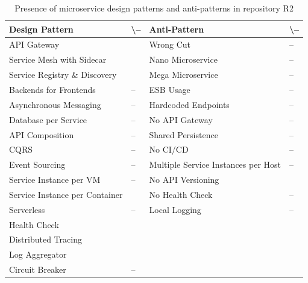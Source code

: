 \documentclass{Configuration_Files/PoliMi3i_thesis}
\newcommand{\cmark}{\ding{51}}%
\begin{document}
\begin{table}[H]
\centering 
    \begin{tabular}{ 
  | >{\centering\arraybackslash} m{16em} 
  | >{\centering\arraybackslash} m{2.2em} 
  | >{\centering\arraybackslash} m{16em} 
  | >{\centering\arraybackslash} m{2.2em} | }
    \hline
    \rowcolor{bluepoli!40}
    \textbf{Design Pattern} & \cmark \textbackslash – & \textbf{Anti-Pattern} & \cmark \textbackslash – \T\B \\
    \hline \hline
    API Gateway & \cmark & Wrong Cut & – \T\B\\
    \hline
    \rowcolor{bluepoli!10}
    Service Mesh with Sidecar & \cmark & Nano Microservice & – \T\B \\
    \hline
    Service Registry \& Discovery & \cmark & Mega Microservice & – \T\B \\
    \hline
    \rowcolor{bluepoli!10}
    Backends for Frontends & – & ESB Usage & – \T\B \\
    \hline
    Asynchronous Messaging & – & Hardcoded Endpoints & – \T\B \\
    \hline
    \rowcolor{bluepoli!10}
    Database per Service & – & No API Gateway & – \T\B \\
    \hline
    API Composition & – & Shared Persistence & – \T\B \\
    \hline
    \rowcolor{bluepoli!10}
    CQRS & – & No CI/CD & – \T\B \\
    \hline
    Event Sourcing & – & Multiple Service Instances per Host & – \T\B \\
    \hline
    \rowcolor{bluepoli!10}
    Service Instance per VM & – & No API Versioning & \cmark \T\B \\
    \hline
    Service Instance per Container & \cmark & No Health Check & – \T\B \\
    \hline
    \rowcolor{bluepoli!10}
    Serverless & – & Local Logging & – \T\B \\
    \hline
    Health Check & \cmark &  & \T\B \\
    \hline
    \rowcolor{bluepoli!10}
    Distributed Tracing & \cmark & & \T\B \\
    \hline
    Log Aggregator & \cmark &  & \T\B \\
    \hline
    \rowcolor{bluepoli!10}
    Circuit Breaker & – &  & \T\B \\
    \hline
    \end{tabular}
    \\[10pt]
    \caption{Presence of microservice design patterns and anti-patterns in repository R2}
    \label{table:R2_result}
\end{table}
\end{document}
